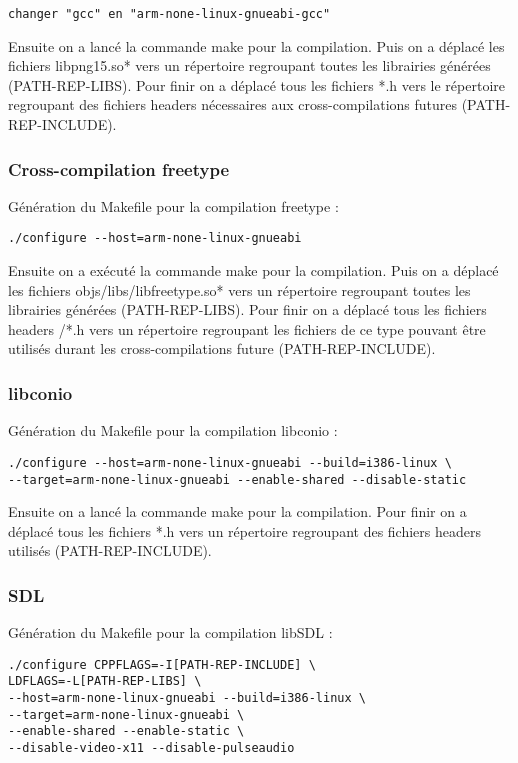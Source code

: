 \begin{lstlisting}
changer "gcc" en "arm-none-linux-gnueabi-gcc"
\end{lstlisting}

Ensuite on a lancé la commande make pour la compilation.
Puis on a  déplacé les fichiers libpng15.so* vers un répertoire regroupant toutes les librairies générées (PATH-REP-LIBS). 
Pour finir on a déplacé tous les fichiers *.h vers le répertoire regroupant des fichiers headers nécessaires aux cross-compilations futures (PATH-REP-INCLUDE).

\subsubsection{Cross-compilation freetype}
Génération du Makefile pour la compilation freetype :

\begin{lstlisting}
./configure --host=arm-none-linux-gnueabi
\end{lstlisting}

Ensuite on a exécuté la commande make pour la compilation.
Puis on a déplacé les fichiers objs/libs/libfreetype.so* vers un répertoire regroupant toutes les librairies générées (PATH-REP-LIBS).
Pour finir on a déplacé tous les fichiers headers /*.h vers un répertoire regroupant les fichiers de ce type pouvant être utilisés durant les cross-compilations future (PATH-REP-INCLUDE).

\subsubsection{libconio}
Génération du Makefile pour la compilation libconio :

\begin{lstlisting}
./configure --host=arm-none-linux-gnueabi --build=i386-linux \
--target=arm-none-linux-gnueabi --enable-shared --disable-static
\end{lstlisting}
Ensuite on a lancé la commande make pour la compilation.
Pour finir on a déplacé tous les fichiers *.h vers un répertoire regroupant des fichiers headers utilisés (PATH-REP-INCLUDE).

\subsubsection{SDL}
Génération du Makefile pour la compilation libSDL :

\begin{lstlisting}
./configure CPPFLAGS=-I[PATH-REP-INCLUDE] \ 
LDFLAGS=-L[PATH-REP-LIBS] \
--host=arm-none-linux-gnueabi --build=i386-linux \ 
--target=arm-none-linux-gnueabi \
--enable-shared --enable-static \
--disable-video-x11 --disable-pulseaudio
\end{lstlisting}

